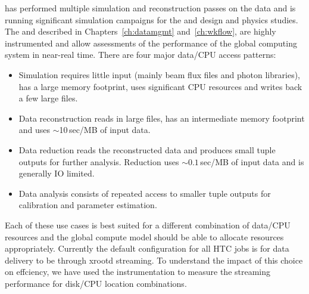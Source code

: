 \documentclass[../main-v1.tex]{subfiles}
\begin{document}
 has performed multiple simulation and reconstruction passes on the  data and is running significant simulation campaigns for the  and  design and physics studies. The  and  described in Chapters~\ref{ch:datamgmt} and~\ref{ch:wkflow}, are highly instrumented and allow assessments of the performance of the global computing system in near-real time.  There are four major data/CPU access patterns:
\begin{itemize}
    \item Simulation requires little input (mainly beam flux files and photon libraries),  has a large memory footprint, uses significant CPU resources and writes back a few large files.
    \item Data reconstruction reads in large files, has an intermediate memory footprint and uses $\sim$10\,sec/MB of input data.  
    \item Data reduction reads the reconstructed data and produces small tuple outputs for further analysis.  Reduction uses $\sim0.1$\,sec/MB of input data and is generally IO limited.
    \item Data analysis consists of repeated access to smaller tuple outputs for calibration and parameter estimation.
\end{itemize}

Each of these use cases is best suited for a different combination of data/CPU resources and the global compute model should be able to allocate resources appropriately.  Currently the default configuration for all HTC jobs is for data delivery to be through xrootd streaming. To understand the impact of this choice on effciency, we have used the  instrumentation to measure the  streaming performance for disk/CPU location combinations. 
\end{document}
